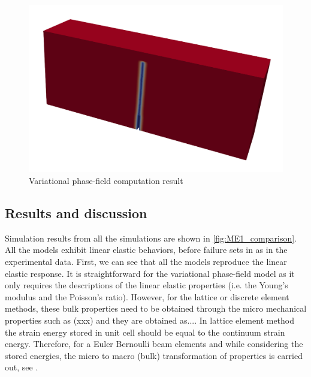 \begin{figure}[!ht]
\centering
\includegraphics[width=1\textwidth]{figures/VPF_ME1_frac.png}
\caption{Variational phase-field computation result}
\label{fig:ME1_TPB_VPF_result}
\end{figure}

\subsection{Results and discussion}
Simulation results from all the simulations are shown in \ref{fig:ME1_comparison}. 
All the models exhibit linear elastic behaviors, before failure sets in as in the experimental data.
First, we can see that all the models reproduce the linear elastic response.
It is straightforward for the variational phase-field model as it only requires the descriptions of the linear elastic properties (i.e. the Young's modulus and the Poisson's ratio).
However, for the lattice or discrete element methods, these bulk properties need to be obtained through the micro mechanical properties such as (xxx) and they are obtained as.... 
In lattice element method the strain energy stored in unit cell should be equal to the continuum strain energy. Therefore, for a Euler Bernoulli beam elements and while considering 
the stored energies, the micro to macro (bulk) transformation of properties is carried out, see \cite{Ostojastarzewski2002}.

